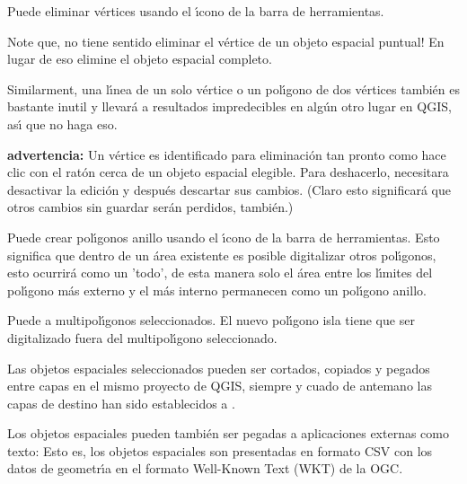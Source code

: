 Puede eliminar v\'ertices usando el \'{\i}cono 
de la barra de herramientas.

Note que, no tiene sentido eliminar el v\'ertice de un objeto espacial puntual!
En lugar de eso elimine el objeto espacial completo.

Similarment, una l\'{\i}nea de un solo v\'ertice o un pol\'{\i}gono de dos v\'ertices también es
bastante inutil y llevar\'a a resultados impredecibles en alg\'un otro lugar en
QGIS, as\'{\i} que no haga eso.

\textbf{advertencia:} Un v\'ertice es identificado para eliminaci\'on tan pronto 
como hace clic con el rat\'on cerca de un objeto espacial elegible.
Para deshacerlo, necesitara desactivar
la edici\'on y después descartar sus cambios.
(Claro esto significar\'a que otros cambios sin guardar ser\'an perdidos, también.)


Puede crear pol\'{\i}gonos anillo usando el \'{\i}cono 
de la barra de herramientas. Esto significa que dentro de un \'area existente es posible digitalizar
otros pol\'{\i}gonos, esto ocurrir\'a como un 'todo', de esta manera solo 
el \'area entre los l\'{\i}mites del pol\'{\i}gono más externo y el más interno permanecen 
como un pol\'{\i}gono anillo. 


Puede  a multipol\'{\i}gonos seleccionados. 
El nuevo pol\'{\i}gono isla tiene que ser digitalizado fuera del multipol\'{\i}gono seleccionado. 


Las objetos espaciales seleccionados pueden ser cortados, copiados y pegados entre capas en el mismo proyecto
de QGIS, siempre y cuado de antemano las capas de destino han sido establecidos a  
.

Los objetos espaciales pueden también ser pegadas a aplicaciones externas como texto:  Esto es,
los objetos espaciales son presentadas en formato CSV con los datos de geometr\'{\i}a 
en el formato Well-Known Text (WKT) de la OGC.


